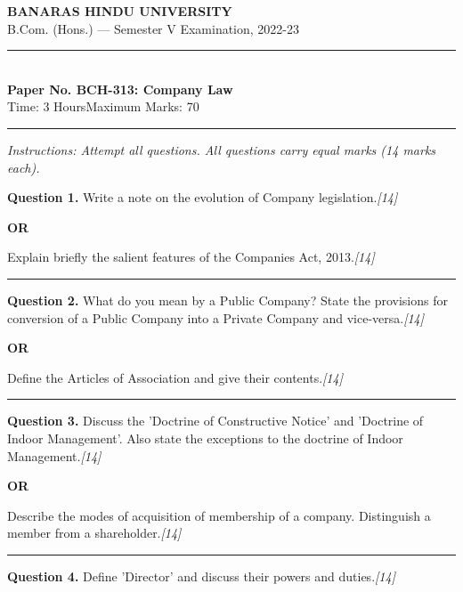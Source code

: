 \documentclass[11pt,a4paper]{article}
\newcommand{\pts}[1]{\hfill   \textit{[#1]}}
\begin{document}
\begin{center}
  {\large\bfseries BANARAS HINDU UNIVERSITY}\\[2pt]
  {\normalsize B.Com. (Hons.) --- Semester V Examination, 2022-23}\\[6pt]
  \rule{0.8\linewidth}{0.5pt}\\[6pt]
  {\large\bfseries Paper No. BCH-313: Company Law}\\[4pt]
  {\normalsize Time: 3 Hours\hfill Maximum Marks: 70}
\end{center}

\rule{\linewidth}{0.4pt}

\smallskip



\noindent   \textit{Instructions: Attempt all questions. All questions carry equal marks (14 marks each).}

\bigskip




\noindent   \textbf{Question 1.}
Write a note on the evolution of Company legislation.\pts{14}

\centerline{   \textbf{OR}}

Explain briefly the salient features of the Companies Act, 2013.\pts{14}

\medskip\rule{\linewidth}{0.2pt}




\noindent   \textbf{Question 2.}
What do you mean by a Public Company? State the provisions for conversion of a Public Company into a Private Company and vice-versa.\pts{14}

\centerline{   \textbf{OR}}

Define the Articles of Association and give their contents.\pts{14}

\medskip\rule{\linewidth}{0.2pt}




\noindent   \textbf{Question 3.}
Discuss the 'Doctrine of Constructive Notice' and 'Doctrine of Indoor Management'. Also state the exceptions to the doctrine of Indoor Management.\pts{14}

\centerline{   \textbf{OR}}

Describe the modes of acquisition of membership of a company. Distinguish a member from a shareholder.\pts{14}

\medskip\rule{\linewidth}{0.2pt}




\noindent   \textbf{Question 4.}
Define 'Director' and discuss their powers and duties.\pts{14}
\end{document}
